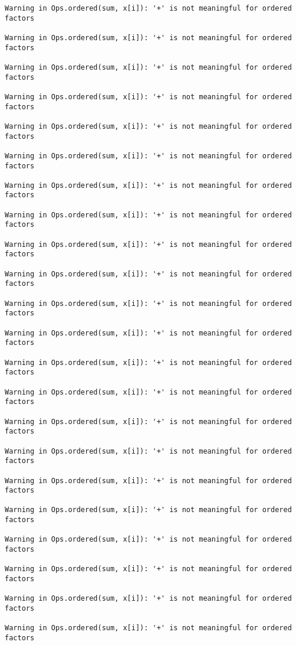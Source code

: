 \documentclass[]{article}
\begin{document}
\begin{verbatim}
Warning in Ops.ordered(sum, x[i]): '+' is not meaningful for ordered
factors

Warning in Ops.ordered(sum, x[i]): '+' is not meaningful for ordered
factors

Warning in Ops.ordered(sum, x[i]): '+' is not meaningful for ordered
factors

Warning in Ops.ordered(sum, x[i]): '+' is not meaningful for ordered
factors

Warning in Ops.ordered(sum, x[i]): '+' is not meaningful for ordered
factors

Warning in Ops.ordered(sum, x[i]): '+' is not meaningful for ordered
factors

Warning in Ops.ordered(sum, x[i]): '+' is not meaningful for ordered
factors

Warning in Ops.ordered(sum, x[i]): '+' is not meaningful for ordered
factors

Warning in Ops.ordered(sum, x[i]): '+' is not meaningful for ordered
factors

Warning in Ops.ordered(sum, x[i]): '+' is not meaningful for ordered
factors

Warning in Ops.ordered(sum, x[i]): '+' is not meaningful for ordered
factors

Warning in Ops.ordered(sum, x[i]): '+' is not meaningful for ordered
factors

Warning in Ops.ordered(sum, x[i]): '+' is not meaningful for ordered
factors

Warning in Ops.ordered(sum, x[i]): '+' is not meaningful for ordered
factors

Warning in Ops.ordered(sum, x[i]): '+' is not meaningful for ordered
factors

Warning in Ops.ordered(sum, x[i]): '+' is not meaningful for ordered
factors

Warning in Ops.ordered(sum, x[i]): '+' is not meaningful for ordered
factors

Warning in Ops.ordered(sum, x[i]): '+' is not meaningful for ordered
factors

Warning in Ops.ordered(sum, x[i]): '+' is not meaningful for ordered
factors

Warning in Ops.ordered(sum, x[i]): '+' is not meaningful for ordered
factors

Warning in Ops.ordered(sum, x[i]): '+' is not meaningful for ordered
factors

Warning in Ops.ordered(sum, x[i]): '+' is not meaningful for ordered
factors


\end{verbatim}
\end{document}
